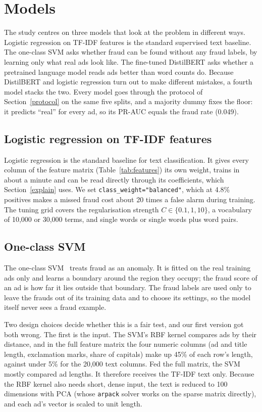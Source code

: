 \section{Models}
\label{models}

The study centres on three models that look at the problem in different ways. Logistic
regression on TF-IDF features is the standard supervised text baseline. The one-class SVM asks
whether fraud can be found without any fraud labels, by learning only what real ads look like. The
fine-tuned DistilBERT asks whether a pretrained language model reads ads better than word counts
do. Because DistilBERT and logistic regression turn out to make different mistakes, a fourth model
stacks the two. Every model goes through the protocol of Section~\ref{protocol} on the same five
splits, and a majority dummy fixes the floor: it predicts ``real'' for every ad, so its PR-AUC
equals the fraud rate (0.049).

\subsection{Logistic regression on TF-IDF features}

Logistic regression is the standard baseline for text classification. It gives every column of
the feature matrix (Table~\ref{tab:features}) its own weight, trains in about a minute and can be
read directly through its coefficients, which Section~\ref{explain} uses. We set
\texttt{class\_weight="balanced"}, which at 4.8\% positives makes a missed fraud cost about 20
times a false alarm during training. The tuning grid covers the regularisation strength
$C \in \{0.1, 1, 10\}$, a vocabulary of 10,000 or 30,000 terms, and single words or single words
plus word pairs.

\subsection{One-class SVM}
\label{ocsvm}

The one-class SVM~\cite{scholkopf2001} treats fraud as an anomaly. It is fitted on the real
training ads only and learns a boundary around the region they occupy; the fraud score of an ad is
how far it lies outside that boundary. The fraud labels are used only to leave the frauds out of
its training data and to choose its settings, so the model itself never sees a fraud example.

Two design choices decide whether this is a fair test, and our first version got both wrong. The
first is the input. The SVM's RBF kernel compares ads by their distance, and in the full feature
matrix the four numeric columns (ad and title length, exclamation marks, share of capitals) make up
45\% of each row's length, against under 5\% for the 20,000 text columns. Fed the full matrix, the
SVM mostly compared ad lengths. It therefore receives the TF-IDF text only. Because the RBF kernel
also needs short, dense input, the text is reduced to 100 dimensions with PCA (whose
\texttt{arpack} solver works on the sparse matrix directly), and each ad's vector is scaled to
unit length.


